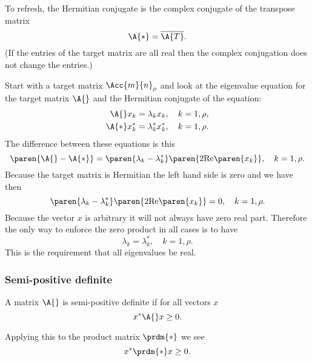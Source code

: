 To refresh, the Hermitian conjugate is the complex conjugate of the transpose matrix
\begin{equation*}
  \A{*} = \overline{\A{T}}.
\end{equation*}
(If the entries of the target matrix are all real then the complex conjugation does not change the entries.)

Start with a target matrix $\Acc{m}{n}_{\rho}$ and look at the eigenvalue equation for the target matrix $\A{}$ and the Hermitian conjugate of the equation:
\begin{equation}
\begin{split}
  \A{}x_{k} &= \lambda_{k}x_{k}, \quad k=1,\rho,\\
  \A{*}x^{*}_{k} &= \lambda^{*}_{k}x^{*}_{k}, \quad k=1,\rho.\\
\end{split}
\end{equation}
The difference between these equations is this
\begin{equation}
  \paren{\A{}-\A{*}} = \paren{\lambda_{k}-\lambda^{*}_{k}}\paren{2 \text{Re}\paren{x_{k}}}, \quad k=1,\rho.
\end{equation}
Because the target matrix is Hermitian the left hand side is zero and we have then
\begin{equation}
  \paren{\lambda_{k}-\lambda^{*}_{k}}\paren{2 \text{Re}\paren{x_{k}}}=0, \quad k=1,\rho.
\end{equation}
Because the vector $x$ is arbitrary it will not always have zero real part. Therefore the only way to enforce the zero product in all cases is to have
\begin{equation}
  \lambda_{k} = \lambda^{*}_{k}, \quad k=1,\rho.
\end{equation}
This is the requirement that all eigenvalues be real.


\subsubsection{Semi-positive definite}
A matrix $\A{}$ is semi-positive definite if for all vectors $x$
\begin{equation}
  x^{*}\A{}x  \geq  0.
\end{equation}

Applying this to the product matrix $\prdm{*}$ we see
\begin{equation}
  x^{*}\prdm{*}x  \geq  0.
  \label{eq:formal:3}
\end{equation}

